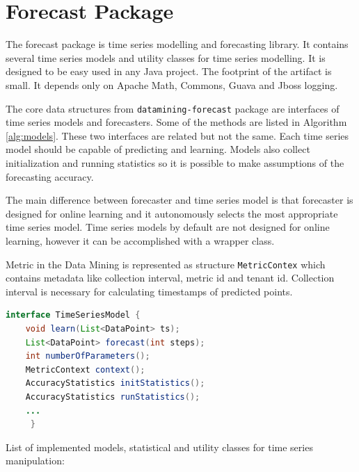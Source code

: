     \section{Forecast Package}
    The forecast package is time series modelling and forecasting library. It contains several time series models
    and utility classes for time series modelling. It is designed to be easy used in any Java project. The footprint
    of the artifact is small. It depends only on Apache Math, Commons, Guava and Jboss logging.

    The core data structures from \texttt{datamining-forecast} package are interfaces of time series models
    and forecasters. Some of the methods are listed in Algorithm \ref{alg:models}. These two interfaces are related but
    not the same. Each time series model should be capable of predicting and learning. Models also collect
    initialization and running statistics so it is possible to make assumptions of the forecasting accuracy.

    The main difference between forecaster and time series model is that forecaster is designed for online learning
    and it autonomously selects the most appropriate time series model. Time series models by default are not
    designed for online learning, however it can be accomplished with a wrapper class.

    Metric in the Data Mining is represented as structure \texttt{MetricContex} which contains metadata like
    collection interval, metric id and tenant id. Collection interval is necessary for calculating timestamps of
    predicted points.

    \begin{lstlisting}[caption={Interface for time series models.}, language=Java, label={alg:models}]
interface TimeSeriesModel {
    void learn(List<DataPoint> ts);
    List<DataPoint> forecast(int steps);
    int numberOfParameters();
    MetricContext context();
    AccuracyStatistics initStatistics();
    AccuracyStatistics runStatistics();
    ...
     }
    \end{lstlisting}

    List of implemented models, statistical and utility classes for time series manipulation:

